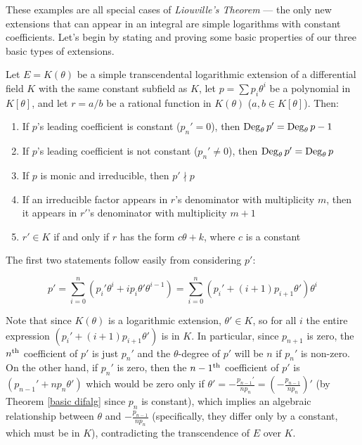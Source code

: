 
These examples are all special cases of {\it Liouville's Theorem} ---
the only new extensions that can appear in an integral are simple
logarithms with constant coefficients.  Let's begin by stating
and proving some basic properties of our three basic types
of extensions.

\theorem\label{basic logarithmic properties}
Let $E=K(\theta)$ be a simple transcendental logarithmic extension of
a differential field $K$ with the same constant subfield as $K$, let
$p=\sum p_i \theta^i$ be a polynomial in $K[\theta]$, and let $r =
a/b$ be a rational function in $K(\theta)$ ($a, b \in K[\theta]$).
Then:

\begin{enumerate}
\item If $p$'s leading coefficient is constant ($p_n' = 0$), then ${\rm Deg}_\theta\, p' = {\rm Deg}_\theta\, p - 1$
\item If $p$'s leading coefficient is not constant ($p_n' \ne 0$), then ${\rm Deg}_\theta\, p' = {\rm Deg}_\theta\, p$
\item If $p$ is monic and irreducible, then $p' \nmid p$
\item If an irreducible factor appears in $r$'s denominator with multiplicity
$m$, then it appears in $r'$'s denominator with multiplicity $m+1$
\item $r' \in K$ if and only if $r$ has the form $c\theta + k$, where $c$ is a constant
\end{enumerate}

\proof

The first two statements follow easily from considering $p'$:

$$p'=\sum_{i=0}^n (p_i' \theta^i + i p_i \theta' \theta^{i-1}) = \sum_{i=0}^n
\left(p_i' + \left(i+1\right)p_{i+1} \theta'\right) \theta^i$$

Note that since $K(\theta)$ is a logarithmic extension, $\theta'
\in K$, so for all $i$ the entire expression $(p_i' + (i+1)p_{i+1} \theta')$
is in $K$.  In particular, since $p_{n+1}$ is zero, the $n^{\rm th}$
coefficient of $p'$ is just $p_n'$ and the $\theta$-degree of $p'$
will be $n$ if $p_n'$ is non-zero.  On the other hand, if $p_n'$ is
zero, then the $n-1^{\rm th}$ coefficient of $p'$ is $(p_{n-1}' + n
p_n \theta')$ which would be zero only if $\theta' =
-\frac{p_{n-1}'}{n p_n} = (-\frac{p_{n-1}}{n p_n})'$ (by Theorem
\ref{basic difalg} since $p_n$ is constant), which implies
an algebraic relationship between $\theta$ and $-\frac{p_{n-1}}{n
p_n}$ (specifically, they differ only by a constant, which must be in
$K$), contradicting the transcendence of $E$ over $K$.

